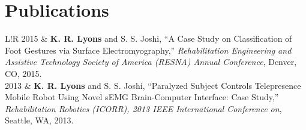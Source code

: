 \documentclass[10pt]{article}
\newcommand\VRule{\color{lightgray}\vrule width 0.5pt}
\begin{document}
\section*{Publications}
\begin{tabular}{L!{\VRule}R}
    2015 &
        \textbf{K. R. Lyons} and S. S. Joshi,
        ``A Case Study on Classification of Foot Gestures via Surface
            Electromyography,''
        \emph{Rehabilitation Engineering and Assistive Technology Society of
            America (RESNA) Annual Conference},
        Denver, CO,
        2015.\\
    [5pt]
    2013 &
        \textbf{K. R. Lyons} and S. S. Joshi,
        ``Paralyzed Subject Controls Telepresence Mobile Robot Using Novel
            {sEMG} Brain-Computer Interface: Case Study,''
        \emph{Rehabilitation Robotics (ICORR), 2013 IEEE International
            Conference on},
        Seattle, WA,
        2013.\\
\end{tabular}
\end{document}
